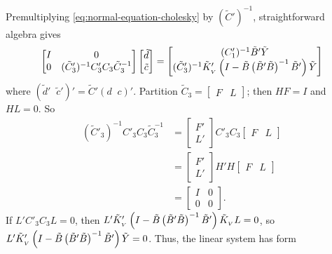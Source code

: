 Premultiplying \eqref{eq:normal-equation-cholesky} by $(\tilde{C}')^{-1}$, straightforward algebra gives 
\begin{equation} \label{eq:vectorized-normal-equations-cholesky}
\begin{bmatrix}
I & 0 \\
0 & (\tilde{C}'_3)^{-1} C'_3 C_3 \tilde{C}_3^{-1}\\
\end{bmatrix}
\begin{bmatrix}
\tilde{d}\\
\tilde{c}\\
\end{bmatrix}
= \begin{bmatrix}
(C'_1)^{-1} \tilde{B}'\tilde{Y} \\
(\tilde{C}'_3)^{-1} \tilde{K}_{_{\scriptscriptstyle V}}'\left( I - \tilde{B}\left( \tilde{B}' \tilde{B} \right)^{-1} \tilde{B}' \right) \tilde{Y}\\
\end{bmatrix}
\end{equation}
\noindent
where $\left( \tilde{d}'\;\;\tilde{c}' \right)' =  \tilde{C}' \left( d\;\;c \right)'$. Partition $\tilde{C}_3 = \begin{bmatrix} F &  L\end{bmatrix}$; then $HF = I$ and $HL = 0$. So
\begin{align*}
(\tilde{C}'_3)^{-1} C'_3 C_3 \tilde{C}_3^{-1} &= \begin{bmatrix} F' \\ L' \end{bmatrix} C'_3C_3 \begin{bmatrix} F &  L\end{bmatrix} \\
&= \begin{bmatrix} F' \\ L' \end{bmatrix} H'H \begin{bmatrix} F &  L\end{bmatrix} \\
&= \begin{bmatrix} I & 0 \\ 0 & 0 \end{bmatrix}.
\end{align*}
\noindent
If $L'C'_3 C_3 L = 0$, then $L'\tilde{K}_{_{\scriptscriptstyle V}}'\left( I - \tilde{B}\left( \tilde{B}' \tilde{B} \right)^{-1} \tilde{B}' \right)\tilde{K}_{_{\scriptscriptstyle V}} L = 0$, so $L'\tilde{K}_{_{\scriptscriptstyle V}}'\left( I - \tilde{B}\left( \tilde{B}' \tilde{B} \right)^{-1} \tilde{B}' \right) \tilde{Y} = 0$. Thus, the linear system has form
